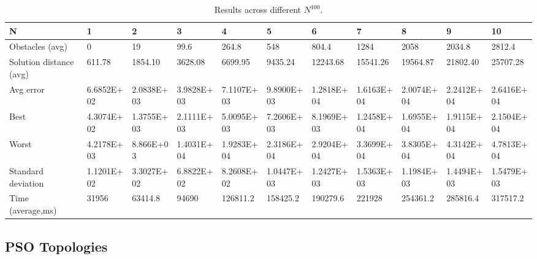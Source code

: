 \documentclass[KomodoMain.tex]{subfiles}
\begin{document}
\pagestyle{empty}
\begin{landscape}
\begin{table}[!htbp]
\small
\caption{\small Results across different $N^100$.}
\label{table:X}
\begin{tabular}{ p{1.8cm} p{1.8cm} p{1.8cm} p{1.8cm} p{1.8cm} p{1.8cm} p{1.8cm} p{1.8cm} p{1.8cm} p{1.8cm} p{1.8cm}}
 \hline
   N & 1 & 2 & 3 & 4 & 5 & 6 & 7 & 8 & 9 & 10 \\
 \hline
  Obstacles (avg)	& 0	& 19 &	99.6 & 264.8 & 548 & 804.4 & 1284 & 2058 & 2034.8 & 2812.4 \\
  Solution distance (avg) & 611.78 & 1854.10 & 3628.08 & 6699.95 & 9435.24 & 12243.68 & 15541.26 & 19564.87 & 21802.40 & 25707.28 \\
   Avg error & 6.6852E+02 & 2.0838E+03 & 3.9828E+03 & 7.1107E+03 & 9.8900E+03 & 1.2818E+04 & 1.6163E+04 & 2.0074E+04 & 2.2412E+04 & 2.6416E+04 \\
  Best & 	4.3074E+02 & 	1.3755E+03 & 	2.1111E+03 & 	5.0095E+03	 & 7.2606E+03	 & 8.1969E+03	 & 1.2458E+04	 & 1.6955E+04	  & 1.9115E+04	 &  2.1504E+04 \\
Worst & 	4.2178E+03 & 	8.866E+03 & 1.4031E+04 & 	1.9283E+04 & 	2.3186E+04 & 	2.9204E+04 & 	3.3699E+04 & 	3.8305E+04 & 	4.3142E+04	 & 4.7813E+04 \\
Standard deviation & 	1.1201E+02	& 3.3027E+02	& 6.8822E+02	& 8.2608E+02	& 1.0447E+03	& 1.2427E+03	& 1.5363E+03	& 1.1984E+03	 & 1.4494E+03	& 1.5479E+03 \\
Time (average,ms)	& 31956	& 63414.8	& 94690	& 126811.2	& 158425.2	& 190279.6	& 221928	& 254361.2 &	285816.4	& 317517.2 \\
 \hline
\end{tabular}
\end{table}
\end{landscape}
\pagestyle{plain}

\newpage


\subsection{PSO Topologies}
\end{document}
